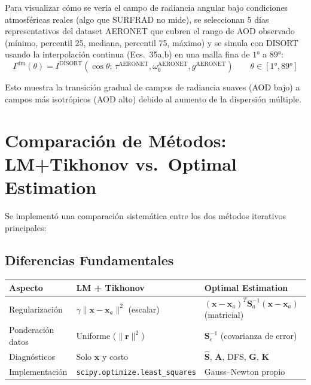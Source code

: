 \documentclass[a4paper,11pt]{article}
\begin{document}
Para visualizar c\'omo se ver\'ia el campo de radiancia angular bajo condiciones
atmosf\'ericas reales (algo que SURFRAD no mide), se seleccionan 5 d\'ias
representativos del dataset AERONET que cubren el rango de AOD observado
(m\'inimo, percentil 25, mediana, percentil 75, m\'aximo) y se simula con
DISORT usando la interpolaci\'on continua (Ecs.~35a,b) en una malla fina de
$1°$ a $89°$:
\begin{equation}
    I^{\text{sim}}(\theta) = I^{\text{DISORT}}(\cos\theta;\,
    \tau^{\text{AERONET}}, \omega_0^{\text{AERONET}}, g^{\text{AERONET}})
    \qquad \theta \in [1°, 89°]
\end{equation}

Esto muestra la transici\'on gradual de campos de radiancia suaves (AOD bajo)
a campos m\'as isotr\'opicos (AOD alto) debido al aumento de la dispersi\'on
m\'ultiple.


\section{Comparaci\'on de M\'etodos: LM+Tikhonov vs.\ Optimal Estimation}
\label{sec:lm_vs_oe}

Se implement\'o una comparaci\'on sistem\'atica entre los dos m\'etodos
iterativos principales:

\subsection{Diferencias Fundamentales}

\begin{center}
\small
\begin{tabular}{@{}lp{5.5cm}p{5.5cm}@{}}
\toprule
\textbf{Aspecto} & \textbf{LM + Tikhonov} & \textbf{Optimal Estimation} \\ \midrule
Regularizaci\'on & $\gamma\|\mathbf{x}-\mathbf{x}_a\|^2$ (escalar) &
    $(\mathbf{x}-\mathbf{x}_a)^T\mathbf{S}_a^{-1}(\mathbf{x}-\mathbf{x}_a)$
    (matricial) \\
Ponderaci\'on datos & Uniforme ($\|\mathbf{r}\|^2$) &
    $\mathbf{S}_\epsilon^{-1}$ (covarianza de error) \\
Diagn\'osticos & Solo $\mathbf{x}$ y costo & $\hat{\mathbf{S}}$,
    $\mathbf{A}$, DFS, $\mathbf{G}$, $\mathbf{K}$ \\
Implementaci\'on & \texttt{scipy.optimize.least\_squares} &
    Gauss--Newton propio \\
\bottomrule
\end{tabular}
\end{center}
\end{document}
